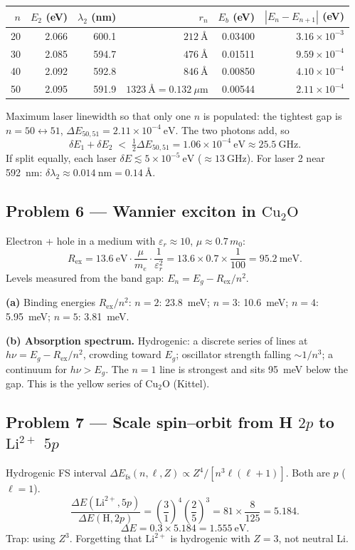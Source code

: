\documentclass[11pt,a4paper]{article}
\begin{document}
\begin{center}
\small
\begin{tabular}{@{}rrrrrr@{}}
\toprule
\(n\) & \(E_2\) (eV) & \(\lambda_2\) (nm) & \(r_n\) & \(E_b\) (eV) & \(|E_n-E_{n+1}|\) (eV) \\
\midrule
20 & 2.066 & 600.1 & \(212~\text{\AA}\) & 0.03400 & \(3.16\times 10^{-3}\) \\
30 & 2.085 & 594.7 & \(476~\text{\AA}\) & 0.01511 & \(9.59\times 10^{-4}\) \\
40 & 2.092 & 592.8 & \(846~\text{\AA}\) & 0.00850 & \(4.10\times 10^{-4}\) \\
50 & 2.095 & 591.9 & \(1323~\text{\AA}=0.132~\mu\mathrm{m}\) & 0.00544 & \(2.11\times 10^{-4}\) \\
\bottomrule
\end{tabular}
\end{center}

Maximum laser linewidth so that only one \(n\) is populated: the tightest gap is \(n=50\leftrightarrow 51\),
\(\Delta E_{50,51}=2.11\times 10^{-4}~\mathrm{eV}\). The two photons add, so
\[
\delta E_1+\delta E_2 \;<\; \tfrac12\Delta E_{50,51}=1.06\times 10^{-4}~\mathrm{eV}
\approx 25.5~\mathrm{GHz}.
\]
If split equally, each laser \(\delta E\lesssim 5\times 10^{-5}~\mathrm{eV}\) (\(\approx 13~\mathrm{GHz}\)).
For laser 2 near 592~nm: \(\delta\lambda_2\approx 0.014~\mathrm{nm}=0.14~\text{\AA}\).

\subsection{Problem 6 --- Wannier exciton in \(\mathrm{Cu_2O}\)}
Electron + hole in a medium with \(\varepsilon_r\approx 10\), \(\mu\approx 0.7\,m_0\):
\[
R_{\mathrm{ex}}=13.6~\mathrm{eV}\cdot\frac{\mu}{m_e}\cdot\frac{1}{\varepsilon_r^2}
=13.6\times 0.7\times\frac{1}{100}
=95.2~\mathrm{meV}.
\]
Levels measured from the band gap: \(E_n=E_g-R_{\mathrm{ex}}/n^2\).

\textbf{(a)} Binding energies \(R_{\mathrm{ex}}/n^2\):
\(n=2\): 23.8~meV; \(n=3\): 10.6~meV; \(n=4\): 5.95~meV; \(n=5\): 3.81~meV.

\textbf{(b) Absorption spectrum.} Hydrogenic: a discrete series of lines at \(h\nu=E_g-R_{\mathrm{ex}}/n^2\), crowding toward \(E_g\); oscillator strength falling \(\sim 1/n^3\); a continuum for \(h\nu>E_g\). The \(n=1\) line is strongest and sits 95~meV below the gap. This is the yellow series of \(\mathrm{Cu_2O}\) (Kittel).

\subsection{Problem 7 --- Scale spin--orbit from H \(2p\) to \(\mathrm{Li}^{2+}\) \(5p\)}
Hydrogenic FS interval \(\Delta E_{\mathrm{fs}}(n,\ell,Z)\propto Z^4/[n^3\ell(\ell+1)]\). Both are \(p\) (\(\ell=1\)).
\[
\frac{\Delta E(\mathrm{Li}^{2+},5p)}{\Delta E(\mathrm{H},2p)}
=\left(\frac{3}{1}\right)^4\left(\frac{2}{5}\right)^3
=81\times\frac{8}{125}=5.184.
\]
\[
\Delta E=0.3\times 5.184=1.555~\mathrm{eV}.
\]
Trap: using \(Z^3\). Forgetting that \(\mathrm{Li}^{2+}\) is hydrogenic with \(Z=3\), not neutral Li.
\end{document}
